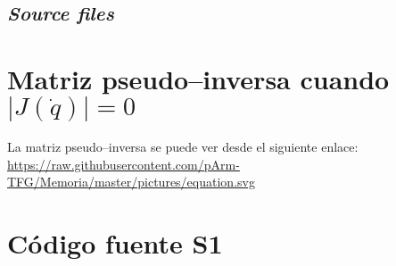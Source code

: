 \section{\textit{Source files}}
























\newpage
\chapter{Matriz pseudo--inversa cuando $\left|J\left(\dot{q}\right)\right| = 0$}
\label{anex:pinv}
La matriz pseudo--inversa se puede ver desde el siguiente enlace:
\url{https://raw.githubusercontent.com/pArm-TFG/Memoria/master/pictures/equation.svg}\qquad
{}

\chapter{Código fuente \ac{S1}}


